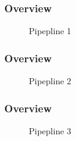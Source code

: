 \documentclass{beamer}
\begin{document}
\begin{frame} %
	\frametitle{Overview} %
	\begin{figure}[h]
		\centering
		\caption{Pipepline 1}
	\end{figure}
\end{frame}
\begin{frame} %
	\frametitle{Overview} %
	\begin{figure}[h]
		\centering
		\caption{Pipepline 2}
	\end{figure}
\end{frame}
\begin{frame} %
	\frametitle{Overview} %
	\begin{figure}[h]
		\centering
		\caption{Pipepline 3}
	\end{figure}
\end{frame}
\end{document}
